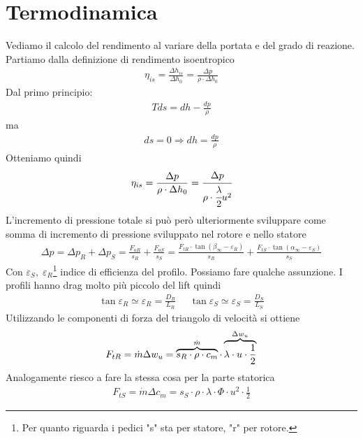 \section{Termodinamica}
Vediamo il calcolo del rendimento al variare della portata e del grado di reazione. Partiamo dalla definizione di rendimento isoentropico
\begin{align*}
\eta_{is} = \frac{\Delta h_{is}}{\Delta h_0} = \frac{\Delta p}{\rho \cdot \Delta h_0}
\end{align*}
Dal primo principio:
\begin{align*}
T ds = dh - \frac{dp}{\rho}
\end{align*}
ma
\begin{align*}
ds = 0 \Rightarrow dh = \frac{dp}{\rho}
\end{align*}
Otteniamo quindi
\begin{equation}\label{eq:etadp}
\eta_{is} = \frac{\Delta p}{\rho \cdot \Delta h_0} = \cfrac{\Delta p}{\rho \cdot \cfrac{\lambda}{2} u^2}
\end{equation}
L'incremento di pressione totale si può però ulteriormente sviluppare come somma di incremento di pressione sviluppato nel rotore e nello statore
\begin{align*}
\Delta p = \Delta p_R + \Delta p_S = \frac{F_{aR}}{s_R} + \frac{F_{aS}}{s_S} = \frac{F_{tR} \cdot \tan(\beta_{\infty} - \varepsilon_R)}{s_R} + \frac{F_{tS} \cdot \tan(\alpha_{\infty} - \varepsilon_S)}{s_S}
\end{align*}
Con $\varepsilon_S, \; \varepsilon_R$\footnote{Per quanto riguarda i pedici "s" sta per statore, "r" per rotore.} indice di efficienza del profilo.
Possiamo fare qualche assunzione. I profili hanno drag molto più piccolo del lift quindi
\begin{align*}
\tan \varepsilon_R \simeq \varepsilon_R = \frac{D_R}{L_R} \;\;\;\;\; \tan \varepsilon_S \simeq \varepsilon_S = \frac{D_S}{L_S}
\end{align*}
Utilizzando le componenti di forza del triangolo di velocità si ottiene
\begin{align*}
F_{tR} = \dot{m} \Delta w_u = \overbrace{s_R \cdot \rho \cdot c_m}^\text{$ \dot{m} $} \cdot \overbrace{\lambda \cdot u \cdot \frac{1}{2}}^\text{$\Delta w_u$}  
\end{align*}
Analogamente riesco a fare la stessa cosa per la parte statorica
\begin{align*}
F_{tS} = \dot{m} \Delta c_m = s_S \cdot \rho \cdot \lambda \cdot \Phi \cdot u^2 \cdot \frac{1}{2}
\end{align*}
